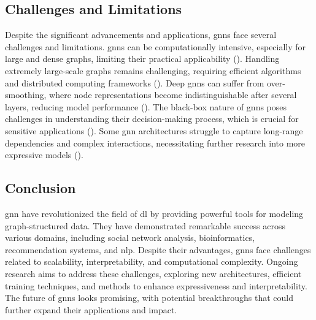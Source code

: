 \subsection*{Challenges and Limitations}
Despite the significant advancements and applications, \glspl{gnn} face several challenges and limitations.
\glspl{gnn} can be computationally intensive, especially for large and dense graphs, limiting their practical applicability (\cite{Hamilton2017}).
Handling extremely large-scale graphs remains challenging, requiring efficient algorithms and distributed computing frameworks (\cite{Chiang2019}).
Deep \glspl{gnn} can suffer from over-smoothing, where node representations become indistinguishable after several layers, reducing model performance (\cite{Li2018}).
The black-box nature of \glspl{gnn} poses challenges in understanding their decision-making process, which is crucial for sensitive applications (\cite{Ying2018}).
Some \gls{gnn} architectures struggle to capture long-range dependencies and complex interactions, necessitating further research into more expressive models (\cite{Xu2019}).

\subsection*{Conclusion}

\acrlong{gnn} have revolutionized the field of \acrlong{dl} by providing powerful tools for modeling graph-structured data. They have demonstrated remarkable success across various domains, including social network analysis, bioinformatics, recommendation systems, and \gls{nlp}. Despite their advantages, \glspl{gnn} face challenges related to scalability, interpretability, and computational complexity. Ongoing research aims to address these challenges, exploring new architectures, efficient training techniques, and methods to enhance expressiveness and interpretability. The future of \glspl{gnn} looks promising, with potential breakthroughs that could further expand their applications and impact.
